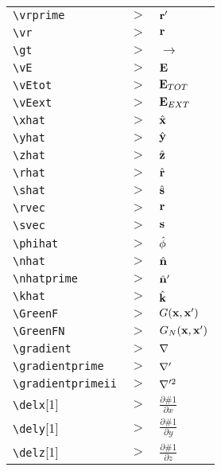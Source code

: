 \begin{tabular}{l l l}

\verb|\vrprime| &$\gt$& ${{\bf r}^{\prime}}$\\[5pt] 
\verb|\vr| &$\gt$& ${{\bf r}}$\\[5pt] 
\verb|\gt| &$\gt$& ${\rightarrow}$\\[5pt] 
\verb|\vE| &$\gt$& ${{\bf E}}$\\[5pt] 
\verb|\vEtot| &$\gt$& ${{\bf E}_{TOT}}$\\[5pt] 
\verb|\vEext| &$\gt$& ${{\bf E}_{EXT}}$\\[5pt] 
\verb|\xhat| &$\gt$& ${\hat{\bf{x}}}$\\[5pt] 
\verb|\yhat| &$\gt$& ${\hat{\bf{y}}}$\\[5pt] 
\verb|\zhat| &$\gt$& ${\hat{\bf{z}}}$\\[5pt] 
\verb|\rhat| &$\gt$& ${\hat{\bf{r}}}$\\[5pt] 
\verb|\shat| &$\gt$& ${\hat{\bf{s}}}$\\[5pt] 
\verb|\rvec| &$\gt$& ${{\bf{r}}}$\\[5pt] 
\verb|\svec| &$\gt$& ${{\bf{s}}}$\\[5pt] 
\verb|\phihat| &$\gt$& ${\hat{\bf{\phi}}}$\\[5pt] 
\verb|\nhat| &$\gt$& ${\hat{\bf n}}$\\[5pt] 
\verb|\nhatprime| &$\gt$& ${\hat{\bf n}^\prime}$\\[5pt] 
\verb|\khat| &$\gt$& ${\hat{\bf k}}$\\[5pt] 
\verb|\GreenF| &$\gt$& ${G({\bf{x}},{\bf{x}^\prime})}$\\[5pt] 
\verb|\GreenFN| &$\gt$& ${G_N({\bf{x}},{\bf{x}^\prime})}$\\[5pt] 
\verb|\gradient| &$\gt$& ${{\bf \nabla}}$\\[5pt] 
\verb|\gradientprime| &$\gt$& ${{\bf \nabla}^{\prime}}$\\[5pt] 
\verb|\gradientprimeii| &$\gt$& ${{\bf \nabla}^{\prime 2}}$\\[5pt] 
\verb|\delx|[1] &$\gt$& ${\frac{\partial \#1}{\partial x}}$\\[5pt] 
\verb|\dely|[1] &$\gt$& ${\frac{\partial \#1}{\partial y}}$\\[5pt] 
\verb|\delz|[1] &$\gt$& ${\frac{\partial \#1}{\partial z}}$\\[5pt] 
\end{tabular}

